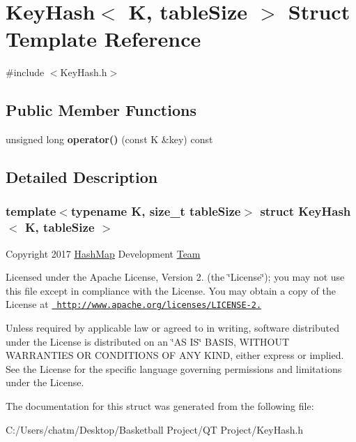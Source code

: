 \hypertarget{struct_key_hash}{}\section{Key\+Hash$<$ K, table\+Size $>$ Struct Template Reference}
\label{struct_key_hash}


{\ttfamily \#include $<$Key\+Hash.\+h$>$}

\subsection*{Public Member Functions}
\begin{DoxyCompactItemize}
\item 
\mbox{\label{struct_key_hash_adf07024f0678f1c703781463745da9f9}} 
unsigned long {\bfseries operator()} (const K \&key) const
\end{DoxyCompactItemize}


\subsection{Detailed Description}
\subsubsection*{template$<$typename K, size\+\_\+t table\+Size$>$\newline
struct Key\+Hash$<$ K, table\+Size $>$}

Copyright 2017 \mbox{\hyperlink{class_hash_map}{Hash\+Map}} Development \mbox{\hyperlink{class_team}{Team}}

Licensed under the Apache License, Version 2. (the \char`\"{}\+License\char`\"{}); you may not use this file except in compliance with the License. You may obtain a copy of the License at \href{http://www.apache.org/licenses/LICENSE-2.0}{\texttt{ http\+://www.\+apache.\+org/licenses/\+L\+I\+C\+E\+N\+S\+E-\/2.}}

Unless required by applicable law or agreed to in writing, software distributed under the License is distributed on an \char`\"{}\+A\+S I\+S\char`\"{} B\+A\+S\+IS, W\+I\+T\+H\+O\+UT W\+A\+R\+R\+A\+N\+T\+I\+ES OR C\+O\+N\+D\+I\+T\+I\+O\+NS OF A\+NY K\+I\+ND, either express or implied. See the License for the specific language governing permissions and limitations under the License. 

The documentation for this struct was generated from the following file\+:\begin{DoxyCompactItemize}
\item 
C\+:/\+Users/chatm/\+Desktop/\+Basketball Project/\+Q\+T Project/Key\+Hash.\+h\end{DoxyCompactItemize}
